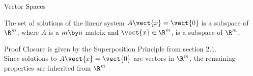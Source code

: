 \documentclass{beamer}
\begin{document}
\begin{frame}{Vector Spaces}
\begin{theorem}
The set of solutions of the linear system $A\vect{x}=\vect{0}$ is a subspace of $\R^m$, where $A$ is a $m \by n$ matrix and $\vect{x}\in\R^m$, is a subspace of $\R^m$.
\end{theorem}\pause
\begin{block}{Proof}
Closure is given by the Superposition Principle from section 2.1.\pause\\
Since solutions to $A\vect{x}=\vect{0}$ are vectors in $\R^m$, the remaining properties are inherited from $\R^m$
\end{block}
\end{frame}
\end{document}
